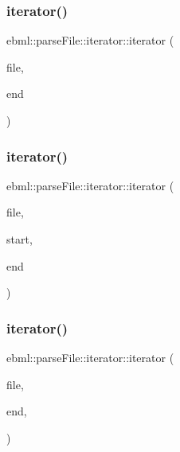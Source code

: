\subsubsection{\texorpdfstring{iterator()}{iterator()}\hspace{0.1cm}{\footnotesize\ttfamily [7/10]}}
{\footnotesize\ttfamily ebml\+::parse\+File\+::iterator\+::iterator (\begin{DoxyParamCaption}\item[{\mbox{\hyperlink{namespaceebml_a7bb59128ac6af27e47367938a846b569}{io\+Base\+\_\+sp}} \&}]{file,  }\item[{off\+\_\+t}]{end }\end{DoxyParamCaption})}

\mbox{\label{classebml_1_1parseFile_1_1iterator_a1366b7ab26a2a322f86b023794255152}} 
\subsubsection{\texorpdfstring{iterator()}{iterator()}\hspace{0.1cm}{\footnotesize\ttfamily [8/10]}}
{\footnotesize\ttfamily ebml\+::parse\+File\+::iterator\+::iterator (\begin{DoxyParamCaption}\item[{\mbox{\hyperlink{namespaceebml_a7bb59128ac6af27e47367938a846b569}{io\+Base\+\_\+sp}} \&}]{file,  }\item[{off\+\_\+t}]{start,  }\item[{off\+\_\+t}]{end }\end{DoxyParamCaption})}

\mbox{\label{classebml_1_1parseFile_1_1iterator_ae86d31d363e514e1d84ddbe30db8e646}} 
\subsubsection{\texorpdfstring{iterator()}{iterator()}\hspace{0.1cm}{\footnotesize\ttfamily [9/10]}}
{\footnotesize\ttfamily ebml\+::parse\+File\+::iterator\+::iterator (\begin{DoxyParamCaption}\item[{\mbox{\hyperlink{namespaceebml_a7bb59128ac6af27e47367938a846b569}{io\+Base\+\_\+sp}} \&}]{file,  }\item[{off\+\_\+t}]{end,  }\item[{\mbox{\hyperlink{classebml_1_1parseFile}{parse\+File}} \&}]{ }\end{DoxyParamCaption})}

